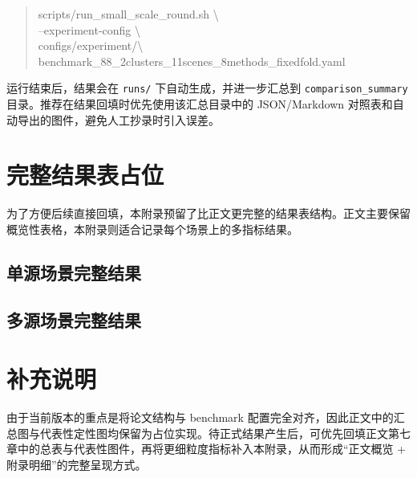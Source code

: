 \begin{quote}
\small
\ttfamily
scripts/run\_small\_scale\_round.sh \textbackslash\\
--experiment-config \textbackslash\\
configs/experiment/\textbackslash\\
benchmark\_88\_2clusters\_11scenes\_8methods\_fixedfold.yaml
\end{quote}

运行结束后，结果会在 \texttt{runs/} 下自动生成，并进一步汇总到 \texttt{comparison\_summary} 目录。推荐在结果回填时优先使用该汇总目录中的 JSON/Markdown 对照表和自动导出的图件，避免人工抄录时引入误差。

\section{完整结果表占位}
为了方便后续直接回填，本附录预留了比正文更完整的结果表结构。正文主要保留概览性表格，本附录则适合记录每个场景上的多指标结果。

\subsection{单源场景完整结果}
\begin{table}[htbp]
\centering
\caption{8 个单源场景的完整结果（占位）}
\label{tab:appendix-single-source-full}
\scriptsize
{}
\normalsize
\end{table}

\subsection{多源场景完整结果}
\begin{table}[htbp]
\centering
\caption{3 个多源场景的完整结果（占位）}
\label{tab:appendix-multi-source-full}
\scriptsize
{}
\normalsize
\end{table}

\section{补充说明}
由于当前版本的重点是将论文结构与 benchmark 配置完全对齐，因此正文中的汇总图与代表性定性图均保留为占位实现。待正式结果产生后，可优先回填正文第七章中的总表与代表性图件，再将更细粒度指标补入本附录，从而形成“正文概览 + 附录明细”的完整呈现方式。
